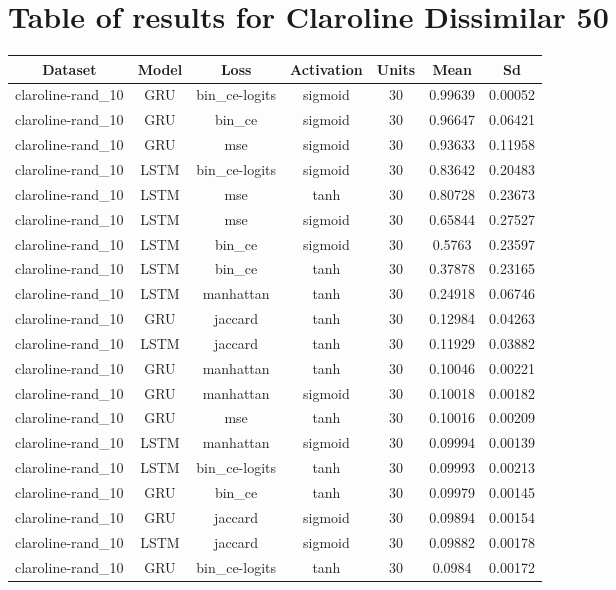 \documentclass{article}%
\begin{document}
\section{Table of results for Claroline Dissimilar 50}%
\label{sec:TableofresultsforClarolineDissimilar50}%
\begin{longtable}{|c|c|c|c|c|c|c|}%
\hline%
\rowcolor{lightgray!70}%
\textbf{Dataset}&\textbf{Model}&\textbf{Loss}&\textbf{Activation}&\textbf{Units}&\textbf{Mean}&\textbf{Sd}\\%
\hline%
claroline{-}rand\_10&GRU&bin\_ce{-}logits&sigmoid&30&0.99639&0.00052\\%
\hline%
claroline{-}rand\_10&GRU&bin\_ce&sigmoid&30&0.96647&0.06421\\%
\hline%
claroline{-}rand\_10&GRU&mse&sigmoid&30&0.93633&0.11958\\%
\hline%
claroline{-}rand\_10&LSTM&bin\_ce{-}logits&sigmoid&30&0.83642&0.20483\\%
\hline%
claroline{-}rand\_10&LSTM&mse&tanh&30&0.80728&0.23673\\%
\hline%
claroline{-}rand\_10&LSTM&mse&sigmoid&30&0.65844&0.27527\\%
\hline%
claroline{-}rand\_10&LSTM&bin\_ce&sigmoid&30&0.5763&0.23597\\%
\hline%
claroline{-}rand\_10&LSTM&bin\_ce&tanh&30&0.37878&0.23165\\%
\hline%
claroline{-}rand\_10&LSTM&manhattan&tanh&30&0.24918&0.06746\\%
\hline%
claroline{-}rand\_10&GRU&jaccard&tanh&30&0.12984&0.04263\\%
\hline%
claroline{-}rand\_10&LSTM&jaccard&tanh&30&0.11929&0.03882\\%
\hline%
claroline{-}rand\_10&GRU&manhattan&tanh&30&0.10046&0.00221\\%
\hline%
claroline{-}rand\_10&GRU&manhattan&sigmoid&30&0.10018&0.00182\\%
\hline%
claroline{-}rand\_10&GRU&mse&tanh&30&0.10016&0.00209\\%
\hline%
claroline{-}rand\_10&LSTM&manhattan&sigmoid&30&0.09994&0.00139\\%
\hline%
claroline{-}rand\_10&LSTM&bin\_ce{-}logits&tanh&30&0.09993&0.00213\\%
\hline%
claroline{-}rand\_10&GRU&bin\_ce&tanh&30&0.09979&0.00145\\%
\hline%
claroline{-}rand\_10&GRU&jaccard&sigmoid&30&0.09894&0.00154\\%
\hline%
claroline{-}rand\_10&LSTM&jaccard&sigmoid&30&0.09882&0.00178\\%
\hline%
claroline{-}rand\_10&GRU&bin\_ce{-}logits&tanh&30&0.0984&0.00172\\%
\hline%
\end{longtable}
\end{document}
